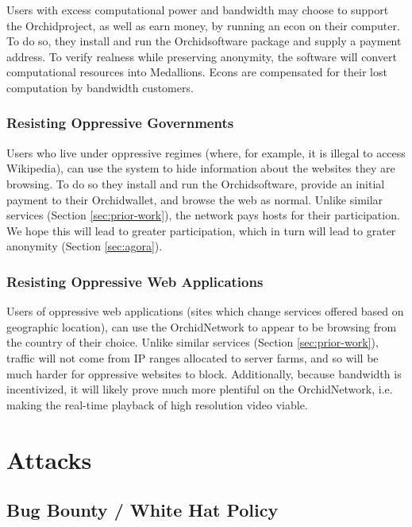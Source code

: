 \documentclass{article}
\newcommand{\orchid}{Orchid}
\newcommand{\Orchid}{\orchid}
\begin{document}
Users with excess computational power and bandwidth may choose to support the \Orchid project, as well as earn money, by running an econ on their computer. To do so, they install and run the \Orchid software package and supply a payment address. To verify realness while preserving anonymity, the software will convert computational resources into Medallions. Econs are compensated for their lost computation by bandwidth customers.

\subsubsection{Resisting Oppressive Governments}

Users who live under oppressive regimes (where, for example, it is illegal to access Wikipedia), can use the system to hide information about the websites they are browsing. To do so they install and run the \Orchid software, provide an initial payment to their \Orchid wallet, and browse the web as normal. Unlike similar services (Section \ref{sec:prior-work}), the network pays hosts for their participation. We hope this will lead to greater participation, which in turn will lead to grater anonymity (Section \ref{sec:agora}).

\subsubsection{Resisting Oppressive Web Applications}

Users of oppressive web applications (sites which change services offered based on geographic location), can use the \Orchid Network to appear to be browsing from the country of their choice. Unlike similar services (Section \ref{sec:prior-work}), traffic will not come from IP ranges allocated to server farms, and so will be much harder for oppressive websites to block. Additionally, because bandwidth is incentivized, it will likely prove much more plentiful on the \Orchid Network, i.e. making the real-time playback of high resolution video viable.


\section{Attacks}
\label{sec:attacks}

\subsection{Bug Bounty / White Hat Policy}
\end{document}
